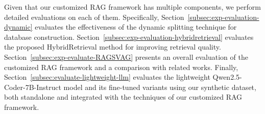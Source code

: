 Given that our customized RAG framework has multiple components, we perform detailed evaluations on each of them. Specifically, Section~\ref{subsec:exp-evaluation-dynamic} evaluates the effectiveness of the dynamic splitting technique for database construction. 
Section~\ref{subsec:exp-evaluation-hybridretrieval} evaluates the proposed HybridRetrieval method for improving retrieval quality. 
Section~\ref{subsec:exp-evaluate-RAGSVAG} presents an overall evaluation of the customized RAG framework and a comparison with related works.
Finally, Section~\ref{subsec:evaluate-lightweight-llm} evaluates the lightweight Qwen2.5-Coder-7B-Instruct model and its fine-tuned variants using our synthetic dataset, both standalone and integrated with the techniques of our customized RAG framework.




